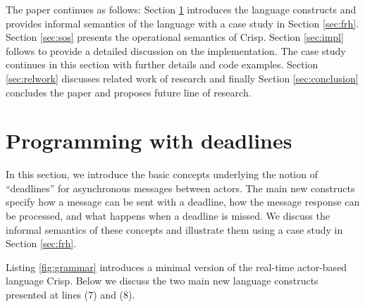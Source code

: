 
The paper continues as follows: Section \ref{sec:deadlines} introduces the language constructs
and provides informal semantics of the language with a case study in Section \ref{sec:frh}. 
Section \ref{sec:sos} presents the operational semantics of Crisp.
Section \ref{sec:impl} follows to provide a detailed discussion on the implementation.
The case study continues in this section with further details and code examples.
Section \ref{sec:relwork} discusses related work of research and 
finally Section \ref{sec:conclusion} concludes the paper and proposes future line of research.

\section{Programming with deadlines} \label{sec:deadlines}
In this section, we introduce the basic concepts underlying  the notion of ``deadlines'' for asynchronous messages between actors. 
The main new constructs specify how a message can be sent with a deadline, how the message response can be processed, and what happens when a deadline is missed.
We discuss the informal semantics of these concepts  and illustrate them using a case study in Section \ref{sec:frh}.

Listing \ref{fig:grammar} introduces a minimal version of the  real-time
actor-based language Crisp.
Below we discuss the two main new language constructs presented at lines (7) and (8).

